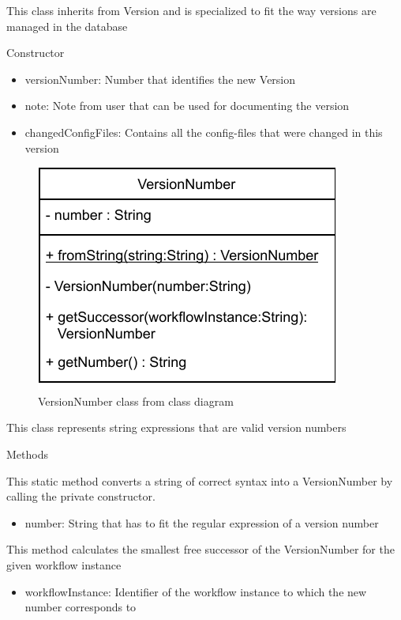 This class inherits from Version and is specialized to fit the way versions are managed in the database
\begin{methodenv}{Constructor}



\begin{itemize}
	\item{versionNumber:}
	Number that identifies the new Version
	\item{note:}
	Note from user that can be used for documenting the version
	\item{changedConfigFiles:}
	Contains all the config-files that were changed in this version
\end{itemize}
\end{methodenv}


\begin{figure}[h]
\centerline{\includegraphics[scale=1]{res/Klassen/VersionNumber.pdf}}
\caption{VersionNumber class from class diagram}
\end{figure}

This class represents string expressions that are valid version numbers
\begin{methodenv}{Methods}

This static method converts a string of correct syntax into a VersionNumber by calling the private constructor.

\begin{itemize}
	\item{number:}
	String that has to fit the regular expression of a version number
\end{itemize}

This method calculates the smallest free successor of the VersionNumber for the given workflow instance

\begin{itemize}
	\item{workflowInstance:}
	Identifier of the workflow instance to which the new number corresponds to
\end{itemize}
\end{methodenv}
\newpage

